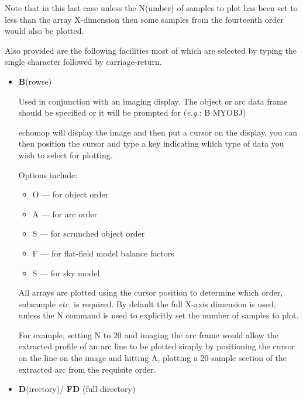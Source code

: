 \documentclass[11pt,twoside]{article}
\newcommand{\sunspec}[2]{#1}
\renewcommand{\sunspec}[2]{#2}
\newcommand{\myindex}[1]{\index{#1}}
\renewcommand{\myindex}[1]{}
\begin{document}
Note that in this last case unless the N(umber) of samples to plot has been
set to less than the array X-dimension then some samples from the
fourteenth order would also be plotted.

Also provided are the following facilities most of which are selected by
typing the single character followed by carriage-return.

\begin{itemize}

\item {\sunspec{\Large\tt}{\bf} B}(rowse)
     \myindex{FIGARO!IMAGE}
     \myindex{Plotter!image browse}
     Used in conjunction with an imaging display.
     The object or arc data frame should be specified or it will be
     prompted for ({\it{e.g.}}:  B MYOBJ)

     {\sc echomop} will display the image and then put a cursor on the display,
     you can then position the cursor and type a key indicating which type of
     data you wish to select for plotting.

     Options include:

     \begin{itemize}

     \item {O --- for object order}
     \item {A --- for arc order}
     \item {S --- for scrunched object order}
     \item {F --- for flat-field model balance factors}
     \item {S --- for sky model}

     \end{itemize}

     All arrays are plotted using the cursor position to determine which
     order, subsample {\it etc.} is required. By default the full X-axis
     dimension is used, unless the N command is used to explicitly set the
     number of samples to plot.

     For example, setting N to 20 and imaging the arc frame would allow
     the extracted profile of an arc line to be plotted simply by
     positioning the cursor on the line on the image and hitting A,
     plotting a 20-sample section of the extracted arc from the requisite
     order.

\item {\sunspec{\Large\tt}{\bf} D}(irectory)/
      {\sunspec{\Large\tt}{\bf} FD} (full directory)
     \myindex{Plotter!known objects}


\end{itemize}
\end{document}
